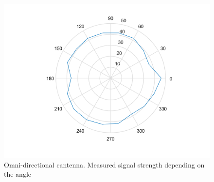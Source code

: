 \documentclass[12pt,a4paper]{article}
\newcommand{\figurewidth}[0]{.65\textwidth}
\begin{document}
\begin{figure}
\begin{center}
	\includegraphics[width=\figurewidth]{plots/polar_omni_p.png}
	\caption{Omni-directional cantenna. Measured signal strength depending on the angle}
	\label{img:ang:pow:omni}
\end{center}\end{figure}
\end{document}
